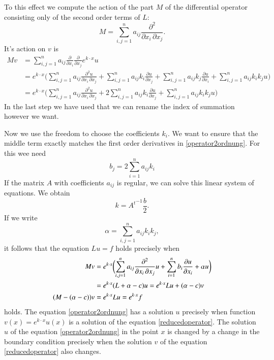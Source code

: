 To this effect we compute the action of the part $M$ of the differential
operator consisting only of the second order terms of $L$:
\[
M=\sum_{i,j=1}^n a_{ij}\frac{\partial^2}{\partial x_i\,\partial x_j}.
\]
It's action on $v$ is
\begin{align*}
Mv
&=
\sum_{i,j=1}^na_{ij}
\frac{\partial}{\partial x_i}
\frac{\partial}{\partial x_j} e^{k\cdot x}u
\\
&=
e^{k\cdot x}
\biggl(
\sum_{i,j=1}^na_{ij}
\frac{\partial^2 u}{\partial x_i\,\partial x_j}
+
\sum_{i,j=1}^n a_{ij}k_i\frac{\partial u}{\partial x_j}
+
\sum_{i,j=1}^n a_{ij}k_j\frac{\partial u}{\partial x_i}
+
\sum_{i,j=1}^n a_{ij}k_ik_ju
\biggr)
\\
&=
e^{k\cdot x}
\biggl(
\sum_{i,j=1}^na_{ij}
\frac{\partial^2 u}{\partial x_i\,\partial x_j}
+
2\sum_{i,j=1}^n a_{ij}k_i\frac{\partial u}{\partial x_j}
+
\sum_{i,j=1}^n a_{ij}k_ik_ju
\biggr)
\end{align*}
In the last step we have used that we can rename the index of summation
however we want.

Now we use the freedom to choose the coefficients $k_i$.
We want to ensure that the middle term exactly matches the
first order derivatives in \eqref{operator2ordnung}.
For this wee need
\begin{equation}
b_j=2\sum_{i=1}^n a_{ij}k_i
\label{bequation}
\end{equation}
If the matrix $A$ with coefficients $a_{ij}$ is regular, we can
solve this linear system of equations.
We obtain
\[
k=
{A^t}^{-1}
\frac{b}2.
\]
If we write
\[
\alpha = \sum_{i,j=1}^n a_{ij}k_ik_j,
\]
it follows that the equation
$Lu=f$ holds precisely when
\begin{align}
Mv
&=
e^{k\cdot x}\biggl(
\sum_{i,j=1}^n a_{ij}\frac{\partial^2}{\partial x_i\,\partial x_j}u
+\sum_{i=1}^n b_i\frac{\partial u}{\partial x_i}+\alpha u
\biggr)
\\
&=
e^{k\cdot x}
(L+\alpha -c)u
=
e^{k\cdot x}Lu + (\alpha -c)v
\notag
\\
(M-(\alpha - c))v&=e^{k\cdot x}Lu=e^{k\cdot x}f
\label{reducedoperator}
\end{align}
holds.
The equation \eqref{operator2ordnung} has a solution $u$ precisely
when function $v(x)=e^{k\cdot x}u(x)$  is a solution of the equation
\eqref{reducedoperator}.
The solution $u$ of the equation \eqref{operator2ordnung} in the point $x$
is changed by a change in the boundary condition precisely when the solution
$v$ of the equation \eqref{reducedoperator} also changes.

